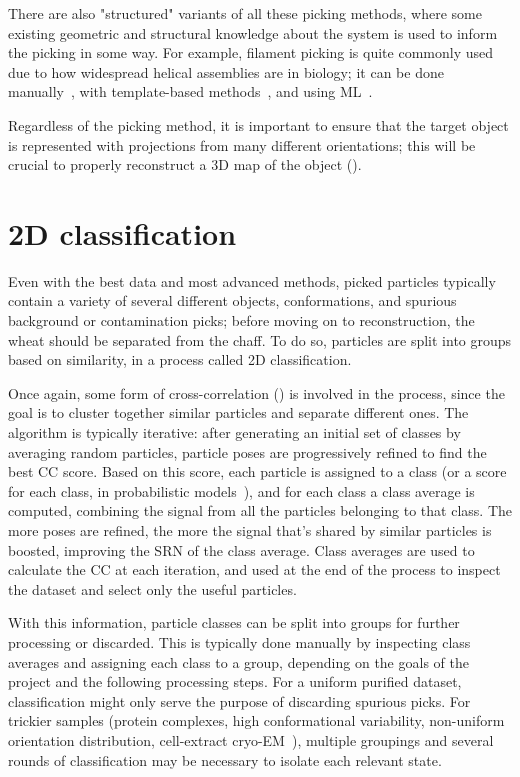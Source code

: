 There are also "structured" variants of all these picking methods, where some existing geometric and structural knowledge about the system is used to inform the picking in some way.
For example, filament picking is quite commonly used due to how widespread helical assemblies are in biology; it can be done manually~\cite{scheresRELIONImplementationBayesian2012,heHelicalReconstructionRELION2017}, with template-based methods~\cite{punjaniCryoSPARCAlgorithmsRapid2017}, and using ML~\cite{wagnerSPHIREcrYOLOFastAccurate2019,wagnerEvolutionSPHIREcrYOLOParticle2020}.

Regardless of the picking method, it is important to ensure that the target object is represented with projections from many different orientations; this will be crucial to properly reconstruct a 3D map of the object ().

\section{2D classification}\label{em_classification}

Even with the best data and most advanced methods, picked particles typically contain a variety of several different objects, conformations, and spurious background or contamination picks; before moving on to reconstruction, the wheat should be separated from the chaff.
To do so, particles are split into groups based on similarity, in a process called 2D classification.

Once again, some form of cross-correlation () is involved in the process, since the goal is to cluster together similar particles and separate different ones.
The algorithm is typically iterative: after generating an initial set of classes by averaging random particles, particle poses are progressively refined to find the best CC score.
Based on this score, each particle is assigned to a class (or a score for each class, in probabilistic models~\cite{scheresRELIONImplementationBayesian2012}), and for each class a class average is computed, combining the signal from all the particles belonging to that class. The more poses are refined, the more the signal that's shared by similar particles is boosted, improving the SRN of the class average.
Class averages are used to calculate the CC at each iteration, and used at the end of the process to inspect the dataset and select only the useful particles.

With this information, particle classes can be split into groups for further processing or discarded.
This is typically done manually by inspecting class averages and assigning each class to a group, depending on the goals of the project and the following processing steps.
For a uniform purified dataset, classification might only serve the purpose of discarding spurious picks.
For trickier samples (protein complexes, high conformational variability, non-uniform orientation distribution, cell-extract cryo-EM~\cite{suBuildRetrieveMethodology2021,kyrilisIntegrativeBiologyNative2019}), multiple groupings and several rounds of classification may be necessary to isolate each relevant state.

